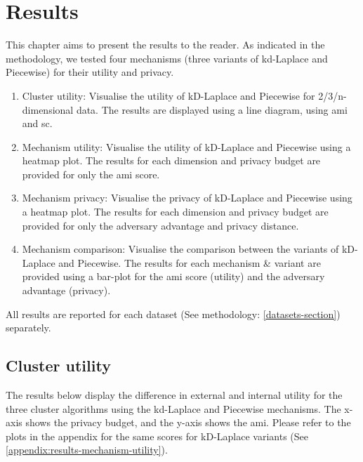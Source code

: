 \chapter{Results}
This chapter aims to present the results to the reader.
As indicated in the methodology, we tested four mechanisms (three variants of kd-Laplace and Piecewise) for their utility and privacy.
\begin{enumerate}
      \item Cluster utility: Visualise the utility of kD-Laplace and Piecewise for 2/3/n-dimensional data.
            The results are displayed using a line diagram, using \gls{ami} and \gls{sc}.
      \item Mechanism utility: Visualise the utility of kD-Laplace and Piecewise using a heatmap plot.
            The results for each dimension and privacy budget are provided for only the \gls{ami} score.
      \item Mechanism privacy: Visualise the privacy of kD-Laplace and Piecewise using a heatmap plot.
            The results for each dimension and privacy budget are provided for only the adversary advantage and privacy distance.
      \item Mechanism comparison: Visualise the comparison between the variants of kD-Laplace and Piecewise.
            The results for each mechanism \& variant are provided using a bar-plot for the \gls{ami} score (utility) and the adversary advantage (privacy).
\end{enumerate}
All results are reported for each dataset (See methodology: \ref{datasets-section}) separately.
\section{Cluster utility}
The results below display the difference in external and internal utility for the three cluster algorithms using the kd-Laplace and Piecewise mechanisms.
The x-axis shows the privacy budget, and the y-axis shows the \gls{ami}.
Please refer to the plots in the appendix for the same scores for kD-Laplace variants (See \ref{appendix:results-mechanism-utility}).
\newpage
